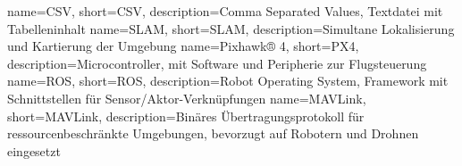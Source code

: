 {
    name=CSV,
    short={CSV},
    description={Comma Separated Values, Textdatei mit Tabelleninhalt}
}
{
    name=SLAM,
    short={SLAM},
    description={Simultane Lokalisierung und Kartierung der Umgebung}
}
{
    name=Pixhawk® 4,
    short=PX4,
    description={Microcontroller, mit Software und Peripherie zur Flugsteuerung}
}
{
    name=ROS,
    short=ROS,
    description={Robot Operating System, Framework mit Schnittstellen für Sensor/Aktor-Verknüpfungen}
}
{
    name=MAVLink,
    short=MAVLink,
    description={Binäres Übertragungsprotokoll für ressourcenbeschränkte Umgebungen, bevorzugt auf Robotern und Drohnen eingesetzt}
}
